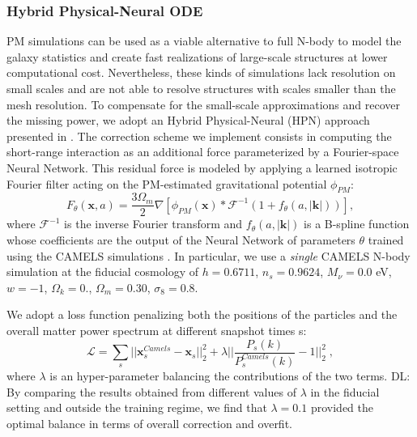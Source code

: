 \documentclass[twocolumn,twocolappendix]{aastex63}
\newcommand{\denise}[1]{{\color{red}DL: #1}}
\begin{document}
\subsubsection{ Hybrid Physical-Neural ODE}\label{N_body_des}    
PM simulations can be used as a viable alternative to full N-body to model the galaxy statistics and create fast realizations of large-scale structures at lower computational cost. Nevertheless, these kinds of simulations lack resolution on small scales and are not able to resolve structures with scales smaller than the mesh resolution.
To compensate for
the small-scale approximations and recover the missing power, we adopt an Hybrid Physical-Neural (HPN) approach presented in \citet{lanzieri2022hybrid}. 
The correction scheme we implement consists in computing the short-range interaction as an additional force parameterized by a Fourier-space Neural Network.
This residual force is modeled by applying a learned isotropic Fourier filter acting
on the PM-estimated gravitational potential $\phi_{PM}$:
\begin{equation}\label{hybrid_model}
    F_\theta(\mathbf{x}, a) = \frac{3 \Omega_m}{2}  \nabla \left[ \phi_{PM} (\mathbf{x}) \ast \mathcal{F}^{-1}(1 + f_\theta(a,|\mathbf{k}|)) \right],
\end{equation}
where $\mathcal{F}^{-1}$ is the inverse Fourier transform and $f_\theta(a,|\mathbf{k}|)$ is a B-spline function whose coefficients are the output of the Neural Network of parameters $\theta$ trained using the CAMELS simulations \citep{villaescusa2021camels}. In particular,  we use a \textit{single} CAMELS N-body simulation at the fiducial cosmology of $h=0.6711$, $n_s =0.9624$, $M_{\nu} = 0.0$ eV, $w=-1$, $\Omega_k = 0.$, $\Omega_m=0.30$, $\sigma_8= 0.8$. 


We adopt a loss function penalizing both the positions
of the particles and the overall matter power spectrum at
different snapshot times s:
\begin{equation}\label{loss2}
    \mathcal{L} =  \sum_{s} || \mathbf{x}^{Camels}_s - \mathbf{x}_s ||_2^2  + \lambda || \frac{P_s(k)}{P_s^{Camels}(k)} -1 ||_2^2 \; ,
\end{equation}
where $\lambda$ is an hyper-parameter balancing the
contributions of the two terms. \denise{By comparing the results obtained from different values of $\lambda$ in the fiducial setting and outside the training regime, we find that $\lambda= 0.1$ provided the optimal balance in terms of overall correction and overfit. 
}
\end{document}
